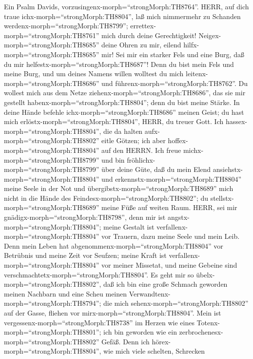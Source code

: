  Ein Psalm Davids,
vorzusingenx-morph=``strongMorph:TH8764''. HERR, auf dich traue
ichx-morph=``strongMorph:TH8804'', laß mich nimmermehr zu Schanden
werdenx-morph=``strongMorph:TH8799'';
errettex-morph=``strongMorph:TH8761'' mich durch deine Gerechtigkeit!
 Neigex-morph=``strongMorph:TH8685'' deine Ohren zu mir,
eilend hilfx-morph=``strongMorph:TH8685'' mir! Sei mir ein starker Fels
und eine Burg, daß du mir helfestx-morph=``strongMorph:TH8687''!
 Denn du bist mein Fels und meine Burg, und um deines Namens
willen wolltest du mich leitenx-morph=``strongMorph:TH8686'' und
führenx-morph=``strongMorph:TH8762''.  Du wollest mich aus
dem Netze ziehenx-morph=``strongMorph:TH8686'', das sie mir gestellt
habenx-morph=``strongMorph:TH8804''; denn du bist meine Stärke.
 In deine Hände befehle ichx-morph=``strongMorph:TH8686''
meinen Geist; du hast mich erlöstx-morph=``strongMorph:TH8804'', HERR,
du treuer Gott.  Ich hassex-morph=``strongMorph:TH8804'',
die da halten aufx-morph=``strongMorph:TH8802'' eitle Götzen; ich aber
hoffex-morph=``strongMorph:TH8804'' auf den HERRN.  Ich
freue michx-morph=``strongMorph:TH8799'' und bin
fröhlichx-morph=``strongMorph:TH8799'' über deine Güte, daß du mein
Elend ansiehstx-morph=``strongMorph:TH8804'' und
erkennstx-morph=``strongMorph:TH8804'' meine Seele in der Not
 und übergibstx-morph=``strongMorph:TH8689'' mich nicht in
die Hände des Feindesx-morph=``strongMorph:TH8802''; du
stellstx-morph=``strongMorph:TH8689'' meine Füße auf weiten Raum.
 HERR, sei mir gnädigx-morph=``strongMorph:TH8798'', denn
mir ist angstx-morph=``strongMorph:TH8804''; meine Gestalt ist
verfallenx-morph=``strongMorph:TH8804'' vor Trauern, dazu meine Seele
und mein Leib.  Denn mein Leben hat
abgenommenx-morph=``strongMorph:TH8804'' vor Betrübnis und meine Zeit
vor Seufzen; meine Kraft ist verfallenx-morph=``strongMorph:TH8804'' vor
meiner Missetat, und meine Gebeine sind
verschmachtetx-morph=``strongMorph:TH8804''.  Es geht mir
so übelx-morph=``strongMorph:TH8802'', daß ich bin eine große Schmach
geworden meinen Nachbarn und eine Scheu meinen
Verwandtenx-morph=``strongMorph:TH8794''; die mich
sehenx-morph=``strongMorph:TH8802'' auf der Gasse, fliehen vor
mirx-morph=``strongMorph:TH8804''.  Mein ist
vergessenx-morph=``strongMorph:TH8738'' im Herzen wie eines
Totenx-morph=``strongMorph:TH8801''; ich bin geworden wie ein
zerbrochenesx-morph=``strongMorph:TH8802'' Gefäß.  Denn ich
hörex-morph=``strongMorph:TH8804'', wie mich viele schelten, Schrecken
